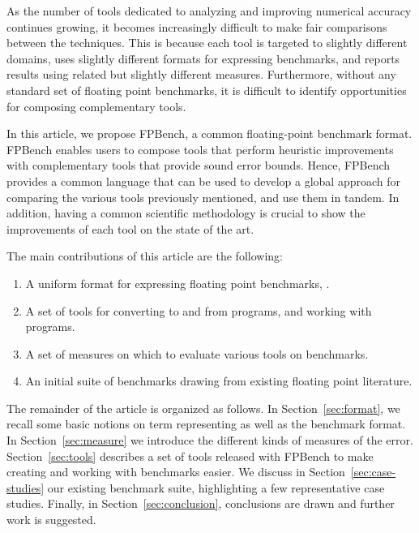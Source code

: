 \documentclass[main.tex]{subfiles}
\begin{document}
As the number of tools dedicated to analyzing and improving numerical
accuracy continues growing, it becomes increasingly difficult to make fair
comparisons between the techniques.  This is because each tool is targeted
to slightly different domains, uses slightly different formats for
expressing benchmarks, and reports results using related but slightly
different measures.  Furthermore, without any standard set of floating
point benchmarks, it is difficult to identify opportunities for composing
complementary tools.

In this article, we propose FPBench, a common floating-point benchmark
format. FPBench enables users to compose tools that perform heuristic
improvements with complementary tools that provide sound error bounds.
Hence, FPBench provides a common language that can be used to develop a
global approach for comparing the various tools previously mentioned, and
use them in tandem. In addition, having a common scientific methodology is
crucial to show the improvements of each tool on the state of the art.


The main contributions of this article are the following:
\begin{enumerate}[label=(\roman*)]
\item A uniform format for expressing floating point benchmarks, \core.
\item A set of tools for converting to and from \core programs, and
  working with \core programs.
\item A set of measures on which to evaluate various tools on \name
  benchmarks.
\item An initial suite of benchmarks drawing from existing floating
  point literature.
\end{enumerate}

The remainder of the article is organized as follows.  In
Section~\ref{sec:format}, we recall some basic notions on term representing
as well as the benchmark format. In Section~\ref{sec:measure} we introduce
the different kinds of measures of the error. Section~\ref{sec:tools}
describes a set of tools released with FPBench to make creating and working
with benchmarks easier. We discuss in Section~\ref{sec:case-studies} our
existing benchmark suite, highlighting a few representative case studies.
Finally, in Section~\ref{sec:conclusion}, conclusions are drawn and further
work is suggested.
\end{document}
